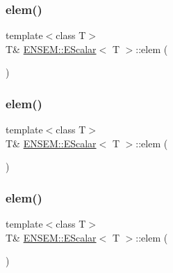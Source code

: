\subsubsection{\texorpdfstring{elem()}{elem()}\hspace{0.1cm}{\footnotesize\ttfamily [1/6]}}
{\footnotesize\ttfamily template$<$class T$>$ \\
T\& \mbox{\hyperlink{classENSEM_1_1EScalar}{E\+N\+S\+E\+M\+::\+E\+Scalar}}$<$ T $>$\+::elem (\begin{DoxyParamCaption}{ }\end{DoxyParamCaption})\hspace{0.3cm}{\ttfamily [inline]}}

\mbox{\label{classENSEM_1_1EScalar_a8de3b840367731efc862fc6943119152}} 
\subsubsection{\texorpdfstring{elem()}{elem()}\hspace{0.1cm}{\footnotesize\ttfamily [2/6]}}
{\footnotesize\ttfamily template$<$class T$>$ \\
T\& \mbox{\hyperlink{classENSEM_1_1EScalar}{E\+N\+S\+E\+M\+::\+E\+Scalar}}$<$ T $>$\+::elem (\begin{DoxyParamCaption}{ }\end{DoxyParamCaption})\hspace{0.3cm}{\ttfamily [inline]}}

\mbox{\label{classENSEM_1_1EScalar_a8de3b840367731efc862fc6943119152}} 
\subsubsection{\texorpdfstring{elem()}{elem()}\hspace{0.1cm}{\footnotesize\ttfamily [3/6]}}
{\footnotesize\ttfamily template$<$class T$>$ \\
T\& \mbox{\hyperlink{classENSEM_1_1EScalar}{E\+N\+S\+E\+M\+::\+E\+Scalar}}$<$ T $>$\+::elem (\begin{DoxyParamCaption}{ }\end{DoxyParamCaption})\hspace{0.3cm}{\ttfamily [inline]}}

